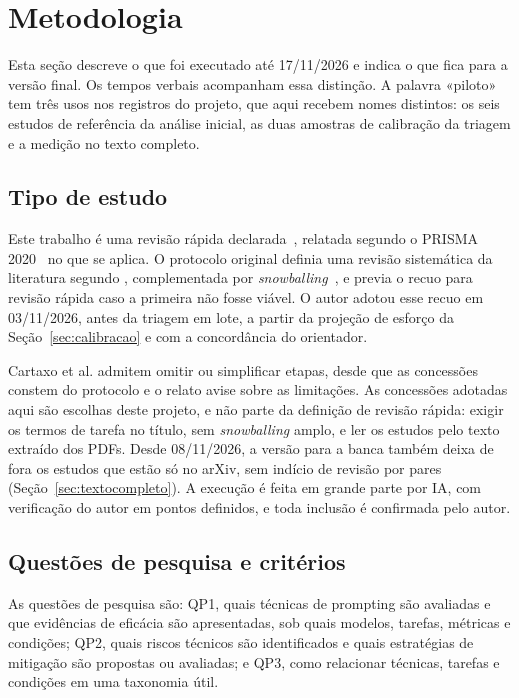 \section{Metodologia}\label{sec:metodologia}
Esta seção descreve o que foi executado até 17/11/2026 e indica o que fica para a versão final. Os tempos
verbais acompanham essa distinção. A palavra «piloto» tem três usos nos registros do projeto, que aqui
recebem nomes distintos: os seis estudos de referência da análise inicial, as duas amostras de
calibração da triagem e a medição no texto completo.

\subsection{Tipo de estudo}
Este trabalho é uma revisão rápida declarada~\citep{cartaxo2020rapid}, relatada segundo o PRISMA
2020~\citep{page2021prisma} no que se aplica. O protocolo original definia uma revisão sistemática da
literatura segundo , complementada por
\textit{snowballing}~\citep{wohlin2014snowballing}, e previa o recuo para revisão rápida caso a primeira
não fosse viável. O autor adotou esse recuo em 03/11/2026, antes da triagem em lote, a partir da projeção
de esforço da Seção~\ref{sec:calibracao} e com a concordância do orientador.

Cartaxo et al. admitem omitir ou simplificar etapas, desde que as concessões constem do protocolo e o
relato avise sobre as limitações. As concessões adotadas aqui são escolhas deste projeto, e não parte da
definição de revisão rápida: exigir os termos de tarefa no título, sem \textit{snowballing} amplo, e ler
os estudos pelo texto extraído dos PDFs. Desde 08/11/2026, a versão para a banca também deixa de fora os estudos
que estão só no arXiv, sem indício de revisão por pares (Seção~\ref{sec:textocompleto}). A execução é feita em grande parte por IA, com verificação do
autor em pontos definidos, e toda inclusão é confirmada pelo autor.

\subsection{Questões de pesquisa e critérios}
As questões de pesquisa são: QP1, quais técnicas de prompting são avaliadas e que evidências de
eficácia são apresentadas, sob quais modelos, tarefas, métricas e condições; QP2, quais riscos
técnicos são identificados e quais estratégias de mitigação são propostas ou avaliadas; e QP3, como
relacionar técnicas, tarefas e condições em uma taxonomia útil.

